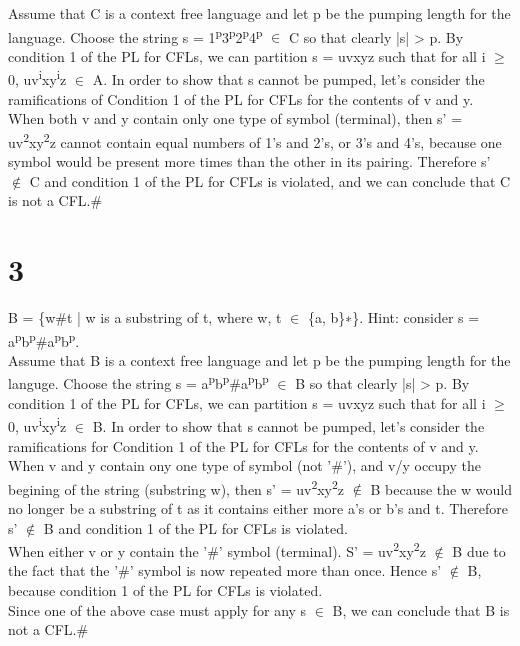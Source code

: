 \documentclass[11pt]{article}
\begin{document}
Assume that C is a context free language and let p be the pumping length for the language. Choose the string s = 1\textsuperscript{p}3\textsuperscript{p}2\textsuperscript{p}4\textsuperscript{p} \(\in\) C so that clearly |s| > p. By condition 1 of the PL for CFLs, we can partition s = uvxyz such that for all i \(\ge\) 0, uv\textsuperscript{i}xy\textsuperscript{i}z \(\in\) A. In order to show that s cannot be pumped, let's consider the ramifications of Condition 1 of the PL for CFLs for the contents of v and y.\\

When both v and y contain only one type of symbol (terminal), then s' = uv\textsuperscript{2}xy\textsuperscript{2}z cannot contain equal numbers of 1's and 2's, or 3's and 4's, because one symbol would be present more times than the other in its pairing. Therefore s' \(\notin\) C and condition 1 of the PL for CFLs is violated, and we can conclude that C is not a CFL.\#\\
\section{3}
\label{sec:org160a401}
B = \{w\#t | w is a substring of t, where w, t \(\in\) \{a, b\}∗\}. Hint: consider s = a\textsuperscript{p}b\textsuperscript{p}\#a\textsuperscript{p}b\textsuperscript{p}.\\

Assume that B is a context free language and let p be the pumping length for the languge. Choose the string s = a\textsuperscript{p}b\textsuperscript{p}\#a\textsuperscript{p}b\textsuperscript{p} \(\in\) B so that clearly |s| > p. By condition 1 of the PL for CFLs, we can partition s = uvxyz such that for all i \(\ge\) 0, uv\textsuperscript{i}xy\textsuperscript{i}z \(\in\) B. In order to show that s cannot be pumped, let's consider the ramifications for Condition 1 of the PL for CFLs for the contents of v and y.\\

When v and y contain ony one type of symbol (not '\#'), and v/y occupy the begining of the string (substring w), then s' = uv\textsuperscript{2}xy\textsuperscript{2}z \(\notin\) B because the w would no longer be a substring of t as it contains either more a's or b's and t. Therefore s' \(\notin\) B and condition 1 of the PL for CFLs is violated.\\

When either v or y contain the '\#' symbol (terminal). S' = uv\textsuperscript{2}xy\textsuperscript{2}z \(\notin\) B due to the fact that the '\#' symbol is now repeated more than once. Hence s' \(\notin\) B, because condition 1 of the PL for CFLs is violated.\\

Since one of the above case must apply for any s \(\in\) B, we can conclude that B is not a CFL.\#\\
\end{document}
